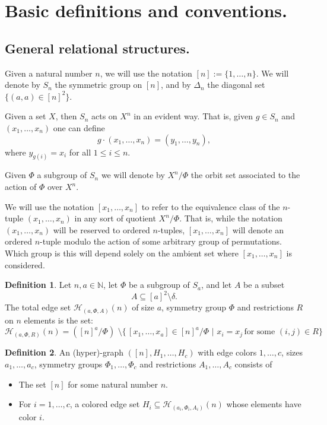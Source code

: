 \documentclass[11pt,notitlepage,a4paper]{article}
\theoremstyle{definition}
\newtheorem{definition}{Definition}[section]
\newcommand{\N}{\mathbb{N}}
\begin{document}
\section{Basic definitions and conventions.}



\subsection{General relational structures.}

Given a natural number $n$, we will use the notation
$[n]:= \{1,\dots, n\}$. We will denote by $S_n$
the symmetric group on $[n]$, and by $\Delta_n$ the 
diagonal set $\{(a,a)\in [n]^2 \}$. \par
Given a set $X$, then $S_n$ acts on $X^n$ in an evident way. That is, 
given $g\in S_n$ and $(x_1, \dots, x_n)$ one can define
\[ g \cdot (x_1,\dots,x_n) =(y_1,\dots,y_n), \]
where $y_{g(i)}=x_i$ for all $1\leq i\leq n$.\par
Given $\Phi$ a subgroup of $S_n$ we will denote by $X^n/\Phi$
the orbit set associated to the action of $\Phi$ over $X^n$.\par
We will use the notation $[x_1,\dots,x_n]$ to refer to the 
equivalence class of the $n$-tuple $(x_1,\dots, x_n)$ in 
any sort of quotient $X^n/\Phi$. That is, while the notation
$(x_1,\dots, x_n)$ will be reserved to ordered $n$-tuples, 
$[x_1,\dots,x_n]$ will denote an ordered $n$-tuple modulo the
action of some arbitrary group of permutations. Which group is this 
will depend solely on the ambient set where $[x_1,\dots,x_n]$ is
considered.
\par


\begin{definition}
	Let $n,a\in \N$, let $\Phi$ be a subgroup of $S_a$, and let
	$A$ be a subset 
	\[ A\subseteq [a]^2 \setminus \delta.\]
	The total edge set $\mathcal{H}_{(a,\Phi, A)}(n)$ of size $a$, 
	symmetry group $\Phi$ and
	restrictions $R$ on $n$ elements is the set:
	\[  \mathcal{H}_{(a,\Phi, R)}(n)= ([n]^a/\Phi) \, \,
	\setminus \{\,  [x_1, \dots,x_a] \in [n]^a/\Phi  \, \, 
	| \, \, x_i=x_j \, \text{for some } (i,j)\in R \} \]
\end{definition}

\begin{definition}
	An (hyper)-graph $([n], H_1,\dots, H_c)$ with edge colors 
	$1,\dots, c$, sizes $a_1,\dots,a_c$, 
	symmetry groups $\Phi_1,\dots,\Phi_c$ and 
	restrictions $A_1,\dots,A_c$ consists of 
	\begin{itemize}
		\item The set $[n]$ for some natural number $n$.
		\item For $i=1,\dots,c$, a colored edge set $H_i\subseteq \mathcal{H}_{(a_i,\Phi_i,A_i)}(n)$ whose elements 
		have color $i$.
	\end{itemize}
\end{definition}
\end{document}

